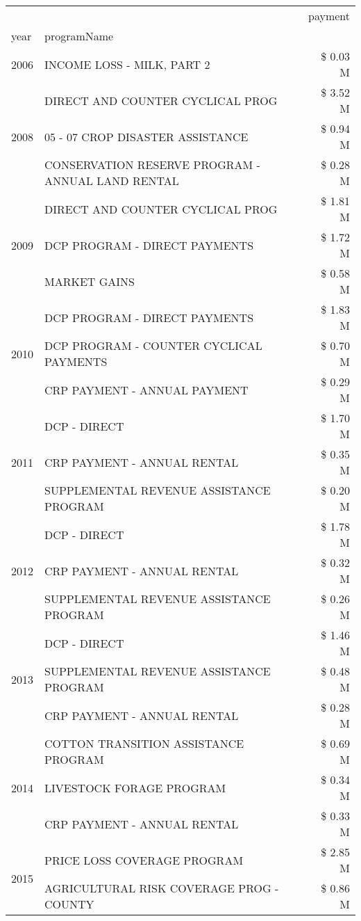 \begin{tabular}{llr}
\toprule
 &  & payment \\
year & programName &  \\
\midrule
2006 & INCOME LOSS - MILK, PART 2 & \$ 0.03 M \\
\cline{1-3}
\multirow[t]{3}{*}{2008} & DIRECT AND COUNTER CYCLICAL PROG & \$ 3.52 M \\
 & 05 - 07 CROP DISASTER ASSISTANCE & \$ 0.94 M \\
 & CONSERVATION RESERVE PROGRAM - ANNUAL LAND RENTAL & \$ 0.28 M \\
\cline{1-3}
\multirow[t]{3}{*}{2009} & DIRECT AND COUNTER CYCLICAL PROG & \$ 1.81 M \\
 & DCP PROGRAM - DIRECT PAYMENTS & \$ 1.72 M \\
 & MARKET GAINS & \$ 0.58 M \\
\cline{1-3}
\multirow[t]{3}{*}{2010} & DCP PROGRAM - DIRECT PAYMENTS & \$ 1.83 M \\
 & DCP PROGRAM - COUNTER CYCLICAL PAYMENTS & \$ 0.70 M \\
 & CRP PAYMENT - ANNUAL PAYMENT & \$ 0.29 M \\
\cline{1-3}
\multirow[t]{3}{*}{2011} & DCP - DIRECT & \$ 1.70 M \\
 & CRP PAYMENT - ANNUAL RENTAL & \$ 0.35 M \\
 & SUPPLEMENTAL REVENUE ASSISTANCE PROGRAM & \$ 0.20 M \\
\cline{1-3}
\multirow[t]{3}{*}{2012} & DCP - DIRECT & \$ 1.78 M \\
 & CRP PAYMENT - ANNUAL RENTAL & \$ 0.32 M \\
 & SUPPLEMENTAL REVENUE ASSISTANCE PROGRAM & \$ 0.26 M \\
\cline{1-3}
\multirow[t]{3}{*}{2013} & DCP - DIRECT & \$ 1.46 M \\
 & SUPPLEMENTAL REVENUE ASSISTANCE PROGRAM & \$ 0.48 M \\
 & CRP PAYMENT - ANNUAL RENTAL & \$ 0.28 M \\
\cline{1-3}
\multirow[t]{3}{*}{2014} & COTTON TRANSITION ASSISTANCE PROGRAM & \$ 0.69 M \\
 & LIVESTOCK FORAGE PROGRAM & \$ 0.34 M \\
 & CRP PAYMENT - ANNUAL RENTAL & \$ 0.33 M \\
\cline{1-3}
\multirow[t]{3}{*}{2015} & PRICE LOSS COVERAGE PROGRAM & \$ 2.85 M \\
 & AGRICULTURAL RISK COVERAGE PROG - COUNTY & \$ 0.86 M \\

\end{tabular}
